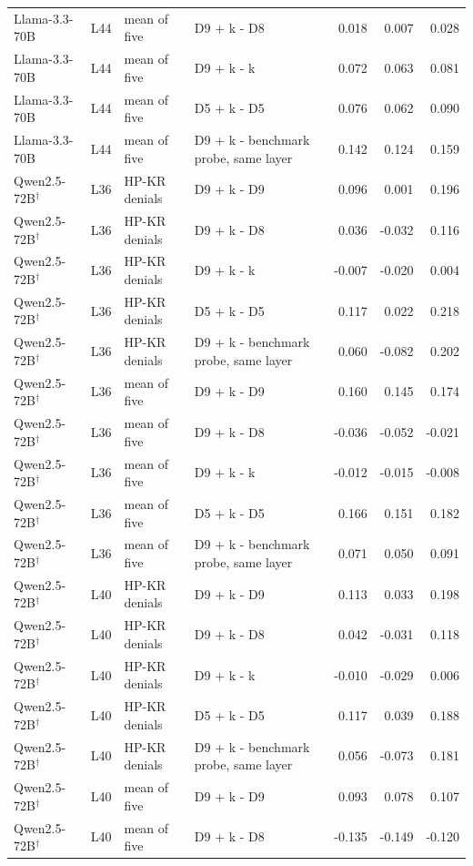 \begin{table}
\begin{tabular}{llllrrr}
Llama-3.3-70B & L44 & mean of five & D9 + k - D8 & 0.018 & 0.007 & 0.028 \\
Llama-3.3-70B & L44 & mean of five & D9 + k - k & 0.072 & 0.063 & 0.081 \\
Llama-3.3-70B & L44 & mean of five & D5 + k - D5 & 0.076 & 0.062 & 0.090 \\
Llama-3.3-70B & L44 & mean of five & D9 + k - benchmark probe, same layer & 0.142 & 0.124 & 0.159 \\
Qwen2.5-72B$^\dagger$ & L36 & HP-KR denials & D9 + k - D9 & 0.096 & 0.001 & 0.196 \\
Qwen2.5-72B$^\dagger$ & L36 & HP-KR denials & D9 + k - D8 & 0.036 & -0.032 & 0.116 \\
Qwen2.5-72B$^\dagger$ & L36 & HP-KR denials & D9 + k - k & -0.007 & -0.020 & 0.004 \\
Qwen2.5-72B$^\dagger$ & L36 & HP-KR denials & D5 + k - D5 & 0.117 & 0.022 & 0.218 \\
Qwen2.5-72B$^\dagger$ & L36 & HP-KR denials & D9 + k - benchmark probe, same layer & 0.060 & -0.082 & 0.202 \\
Qwen2.5-72B$^\dagger$ & L36 & mean of five & D9 + k - D9 & 0.160 & 0.145 & 0.174 \\
Qwen2.5-72B$^\dagger$ & L36 & mean of five & D9 + k - D8 & -0.036 & -0.052 & -0.021 \\
Qwen2.5-72B$^\dagger$ & L36 & mean of five & D9 + k - k & -0.012 & -0.015 & -0.008 \\
Qwen2.5-72B$^\dagger$ & L36 & mean of five & D5 + k - D5 & 0.166 & 0.151 & 0.182 \\
Qwen2.5-72B$^\dagger$ & L36 & mean of five & D9 + k - benchmark probe, same layer & 0.071 & 0.050 & 0.091 \\
Qwen2.5-72B$^\dagger$ & L40 & HP-KR denials & D9 + k - D9 & 0.113 & 0.033 & 0.198 \\
Qwen2.5-72B$^\dagger$ & L40 & HP-KR denials & D9 + k - D8 & 0.042 & -0.031 & 0.118 \\
Qwen2.5-72B$^\dagger$ & L40 & HP-KR denials & D9 + k - k & -0.010 & -0.029 & 0.006 \\
Qwen2.5-72B$^\dagger$ & L40 & HP-KR denials & D5 + k - D5 & 0.117 & 0.039 & 0.188 \\
Qwen2.5-72B$^\dagger$ & L40 & HP-KR denials & D9 + k - benchmark probe, same layer & 0.056 & -0.073 & 0.181 \\
Qwen2.5-72B$^\dagger$ & L40 & mean of five & D9 + k - D9 & 0.093 & 0.078 & 0.107 \\
Qwen2.5-72B$^\dagger$ & L40 & mean of five & D9 + k - D8 & -0.135 & -0.149 & -0.120 \\

\end{tabular}
\end{table}
